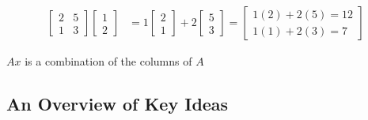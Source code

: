 \documentclass[12pt]{article}
\begin{document}
\begin{align*}
    \begin{bmatrix}
      2 & 5\\
      1 & 3
    \end{bmatrix}
    \begin{bmatrix}
    1\\
    2
    \end{bmatrix}
    &= 
    1 \begin{bmatrix}
    2\\
    1
    \end{bmatrix}
    +
    2 \begin{bmatrix}
    5\\
    3
    \end{bmatrix}
    = \begin{bmatrix}
    1(2) + 2(5) = 12\\
    1(1) + 2(3) = 7
    \end{bmatrix}
\end{align*}

$Ax$ is a combination of the columns of $ A $

\subsection{An Overview of Key Ideas}\label{}
\end{document}
